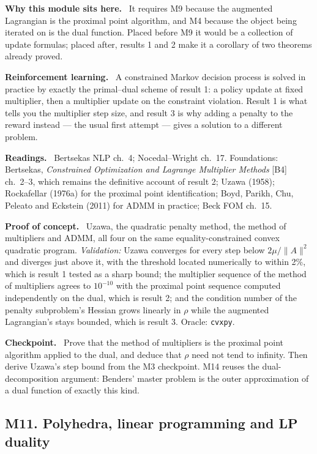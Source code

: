 \documentclass[11pt,a4paper]{article}
\newcommand{\mpart}[1]{\smallskip\noindent\textbf{#1}\ \ignorespaces}
\begin{document}
\mpart{Why this module sits here.} It requires M9 because the augmented Lagrangian is the
proximal point algorithm, and M4 because the object being iterated on is the dual function.
Placed before M9 it would be a collection of update formulas; placed after, results 1 and 2
make it a corollary of two theorems already proved.

\mpart{Reinforcement learning.} A constrained Markov decision process is solved in practice by
exactly the primal--dual scheme of result 1: a policy update at fixed multiplier, then a
multiplier update on the constraint violation. Result 1 is what tells you the multiplier step
size, and result 3 is why adding a penalty to the reward instead --- the usual first attempt
--- gives a solution to a different problem.

\mpart{Readings.} Bertsekas NLP ch.~4; Nocedal--Wright ch.~17. Foundations: Bertsekas,
\emph{Constrained Optimization and Lagrange Multiplier Methods} [B4] ch.~2--3, which remains
the definitive account of result 2; Uzawa (1958); Rockafellar (1976a) for the proximal point
identification; Boyd, Parikh, Chu, Peleato and Eckstein (2011) for ADMM in practice; Beck FOM
ch.~15.

\mpart{Proof of concept.} Uzawa, the quadratic penalty method, the method of multipliers and
ADMM, all four on the same equality-constrained convex quadratic program.
\emph{Validation:} Uzawa converges for every step below $2\mu/\|A\|^2$ and diverges just above
it, with the threshold located numerically to within 2\%, which is result 1 tested as a sharp
bound; the multiplier sequence of the method of multipliers agrees to $10^{-10}$ with the
proximal point sequence computed independently on the dual, which is result 2; and the
condition number of the penalty subproblem's Hessian grows linearly in $\rho$ while the
augmented Lagrangian's stays bounded, which is result 3. Oracle: \texttt{cvxpy}.

\mpart{Checkpoint.} Prove that the method of multipliers is the proximal point algorithm
applied to the dual, and deduce that $\rho$ need not tend to infinity. Then derive Uzawa's step
bound from the M3 checkpoint. M14 reuses the dual-decomposition argument: Benders' master
problem is the outer approximation of a dual function of exactly this kind.

\subsection{M11. Polyhedra, linear programming and LP duality}
\end{document}
